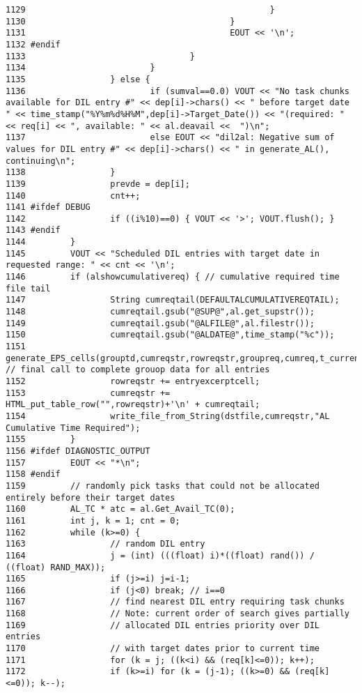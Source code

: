\begin{verbatim}
1129                                                 }
1130                                         }
1131                                         EOUT << '\n';
1132 #endif
1133                                 }
1134                         }
1135                 } else {
1136                         if (sumval==0.0) VOUT << "No task chunks available for DIL entry #" << dep[i]->chars() << " before target date " << time_stamp("%Y%m%d%H%M",dep[i]->Target_Date()) << "(required: " << req[i] << ", available: " << al.deavail <<  ")\n";
1137                         else EOUT << "dil2al: Negative sum of values for DIL entry #" << dep[i]->chars() << " in generate_AL(), continuing\n";
1138                 }
1139                 prevde = dep[i];
1140                 cnt++;
1141 #ifdef DEBUG
1142                 if ((i%10)==0) { VOUT << '>'; VOUT.flush(); }
1143 #endif
1144         }
1145         VOUT << "Scheduled DIL entries with target date in requested range: " << cnt << '\n';
1146         if (alshowcumulativereq) { // cumulative required time file tail
1147                 String cumreqtail(DEFAULTALCUMULATIVEREQTAIL);
1148                 cumreqtail.gsub("@SUP@",al.get_supstr());
1149                 cumreqtail.gsub("@ALFILE@",al.filestr());
1150                 cumreqtail.gsub("@ALDATE@",time_stamp("%c"));
1151                 generate_EPS_cells(grouptd,cumreqstr,rowreqstr,groupreq,cumreq,t_current,*prevde); // final call to complete grouop data for all entries
1152                 rowreqstr += entryexcerptcell;
1153                 cumreqstr += HTML_put_table_row("",rowreqstr)+'\n' + cumreqtail;
1154                 write_file_from_String(dstfile,cumreqstr,"AL Cumulative Time Required");
1155         }
1156 #ifdef DIAGNOSTIC_OUTPUT
1157         EOUT << "*\n";
1158 #endif
1159         // randomly pick tasks that could not be allocated entirely before their target dates
1160         AL_TC * atc = al.Get_Avail_TC(0);
1161         int j, k = 1; cnt = 0;
1162         while (k>=0) {
1163                 // random DIL entry
1164                 j = (int) (((float) i)*((float) rand()) / ((float) RAND_MAX));
1165                 if (j>=i) j=i-1;
1166                 if (j<0) break; // i==0
1167                 // find nearest DIL entry requiring task chunks
1168                 // Note: current order of search gives partially
1169                 // allocated DIL entries priority over DIL entries
1170                 // with target dates prior to current time
1171                 for (k = j; ((k<i) && (req[k]<=0)); k++);
1172                 if (k>=i) for (k = (j-1); ((k>=0) && (req[k]<=0)); k--);

\end{verbatim}
